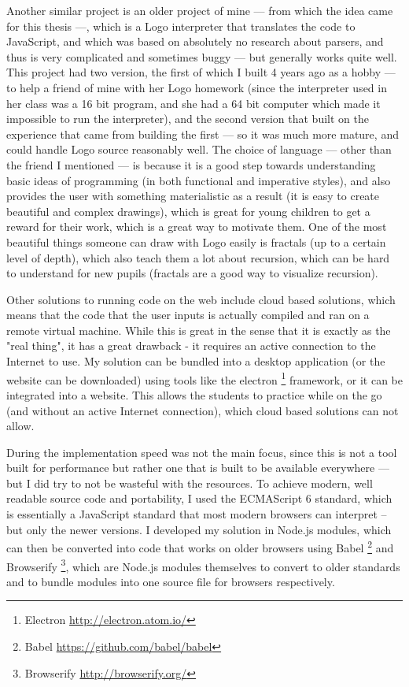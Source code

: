 Another similar project is an older project of mine --- from which the idea came for this thesis ---, which is a Logo interpreter that translates the code to JavaScript, and which was based on absolutely no research about parsers, and thus is very complicated and sometimes buggy --- but generally works quite well. This project had two version, the first of which I built 4 years ago as a hobby --- to help a friend of mine with her Logo homework (since the interpreter used in her class was a 16 bit program, and she had a 64 bit computer which made it impossible to run the interpreter), and the second version that built on the experience that came from building the first --- so it was much more mature, and could handle Logo source reasonably well. The choice of language --- other than the friend I mentioned --- is because it is a good step towards understanding basic ideas of programming (in both functional and imperative styles), and also provides the user with something materialistic as a result (it is easy to create beautiful and complex drawings), which is great for young children to get a reward for their work, which is a great way to motivate them. One of the most beautiful things someone can draw with Logo easily is fractals (up to a certain level of depth), which also teach them a lot about recursion, which can be hard to understand for new pupils (fractals are a good way to visualize recursion).

Other solutions to running code on the web include cloud based solutions, which means that the code that the user inputs is actually compiled and ran on a remote virtual machine. While this is great in the sense that it is exactly as the "real thing", it has a great drawback - it requires an active connection to the Internet to use. My solution can be bundled into a desktop application (or the website can be downloaded) using tools like the electron \footnote{Electron \url{http://electron.atom.io/}} framework, or it can be integrated into a website. This allows the students to practice while on the go (and without an active Internet connection), which cloud based solutions can not allow.

During the implementation speed was not the main focus, since this is not a tool built for performance but rather one that is built to be available everywhere --- but I did try to not be wasteful with the resources. To achieve modern, well readable source code and portability, I used the ECMAScript 6 standard, which is essentially a JavaScript standard that most modern browsers can interpret -- but only the newer versions. I developed my solution in Node.js modules, which can then be converted into code that works on older browsers using Babel \footnote{Babel \url{https://github.com/babel/babel}} and Browserify \footnote{Browserify \url{http://browserify.org/}}, which are Node.js modules themselves to convert to older standards and to bundle modules into one source file for browsers respectively.

